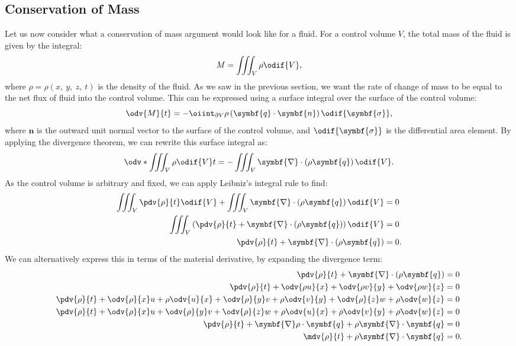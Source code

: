 \documentclass{article}
\theoremstyle{definition}
\begin{document}
\subsection{Conservation of Mass}
Let us now consider what a conservation of mass argument would look
like for a fluid. For a control volume \(V\), the total mass of the
fluid is given by the integral:
\begin{equation*}
    M = \iiint_V \rho \odif{V},
\end{equation*}
where \(\rho = \rho\left( x,\: y,\: z,\: t \right)\) is the density of
the fluid. As we saw in the previous
section, we want the rate of change of mass to be equal to the net flux
of fluid into the control volume. This can be expressed using a surface
integral over the surface of the control volume:
\begin{equation*}
    \odv{M}{t} = -\oiint_{\partial V} \rho \left( \symbf{q} \cdot \symbf{n} \right) \odif{\symbf{\sigma}},
\end{equation*}
where \(\symbf{n}\) is the outward unit normal vector to the surface of
the control volume, and \(\odif{\symbf{\sigma}}\) is the differential
area element. By applying the divergence theorem, we can rewrite this
surface integral as:
\begin{equation*}
    \odv*{\iiint_V \rho \odif{V}}{t} = -\iiint_V \symbf{\nabla} \cdot \left( \rho \symbf{q} \right) \odif{V}.
\end{equation*}
As the control volume is arbitrary and fixed, we can apply Leibniz's
integral rule to find:
\begin{align*}
    \iiint_V \pdv{\rho}{t} \odif{V} + \iiint_V \symbf{\nabla} \cdot \left( \rho \symbf{q} \right) \odif{V} & = 0  \\
    \iiint_V \left( \pdv{\rho}{t} + \symbf{\nabla} \cdot \left( \rho \symbf{q} \right) \right) \odif{V}    & = 0  \\
    \pdv{\rho}{t} + \symbf{\nabla} \cdot \left( \rho \symbf{q} \right)                                     & = 0.
\end{align*}
We can alternatively express this in terms of the material derivative,
by expanding the divergence term:
\begin{align*}
    \pdv{\rho}{t} + \symbf{\nabla} \cdot \left( \rho \symbf{q} \right)                                                        & = 0  \\
    \pdv{\rho}{t} + \odv{\rho u}{x} + \odv{\rho v}{y} + \odv{\rho w}{z}                                                       & = 0  \\
    \pdv{\rho}{t} + \odv{\rho}{x} u + \rho \odv{u}{x} + \odv{\rho}{y} v + \rho \odv{v}{y} + \odv{\rho}{z} w + \rho \odv{w}{z} & = 0  \\
    \pdv{\rho}{t} + \odv{\rho}{x} u + \odv{\rho}{y} v + \odv{\rho}{z} w + \rho \odv{u}{x} + \rho \odv{v}{y} + \rho \odv{w}{z} & = 0  \\
    \pdv{\rho}{t} + \symbf{\nabla} \rho \cdot \symbf{q} + \rho \symbf{\nabla} \cdot \symbf{q}                                 & = 0  \\
    \mdv{\rho}{t} + \rho \symbf{\nabla} \cdot \symbf{q}                                                                       & = 0.
\end{align*}
\end{document}
